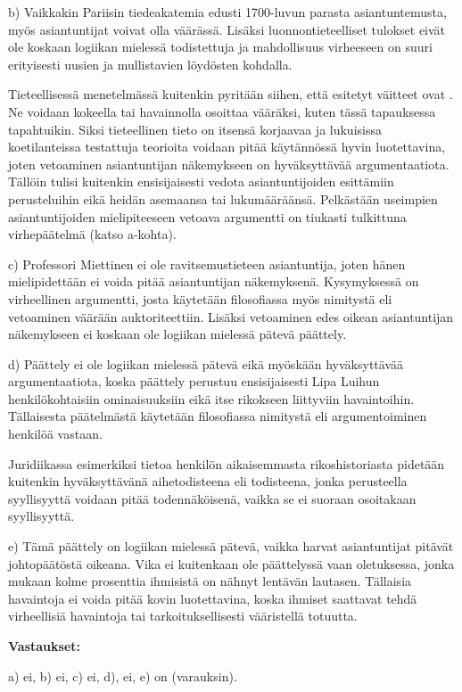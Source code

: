 \begin{esimerkki}
b) Vaikkakin Pariisin tiedeakatemia edusti 1700-luvun parasta asiantuntemusta, myös asiantuntijat voivat olla väärässä. Lisäksi luonnontieteelliset tulokset eivät ole koskaan logiikan mielessä todistettuja ja mahdollisuus virheeseen on suuri erityisesti uusien ja mullistavien löy\-dös\-ten kohdalla.

Tieteellisessä menetelmässä kuitenkin pyritään siihen, että esitetyt väitteet ovat . Ne voidaan kokeella tai havainnolla osoittaa vääräksi, kuten tässä tapauksessa tapahtuikin. Siksi tieteellinen tieto on itsensä korjaavaa ja lukuisissa koetilanteissa testattuja teorioita voidaan pitää käytännössä hyvin luotettavina, joten vetoaminen asiantuntijan näkemykseen on hyväksyttävää argumentaatiota. Tällöin tulisi kuitenkin ensisijaisesti vedota asiantuntijoiden esittämiin perusteluihin eikä heidän asemaansa tai lukumääräänsä. Pelkästään useimpien asiantuntijoiden mielipiteeseen vetoava argumentti on tiukasti tulkittuna virhepäätelmä (katso a-kohta).

c) Professori Miettinen ei ole ravitsemustieteen asiantuntija, joten hänen mielipidettään ei voida pitää asiantuntijan näkemyksenä. Kysymyksessä on virheellinen argumentti, josta käytetään filosofiassa myös nimitystä  eli vetoaminen väärään auktoriteettiin. Lisäksi vetoaminen edes oikean asiantuntijan näkemykseen ei koskaan ole logiikan mielessä pätevä päättely.

d) Päättely ei ole logiikan mielessä pätevä eikä myöskään hy\-väk\-syt\-tä\-vää argumentaatiota, koska päättely perustuu ensisijaisesti Lipa Luihun henkilökohtaisiin ominaisuuksiin eikä itse rikokseen liittyviin havaintoihin. Tällaisesta päätelmästä käytetään filosofiassa nimitystä  eli argumentoiminen henkilöä vastaan.

Juridiikassa esimerkiksi tietoa henkilön aikaisemmasta rikoshistoriasta pidetään kuitenkin hyväksyttävänä aihetodisteena eli todisteena, jonka perusteella syyllisyyttä voidaan pitää todennäköisenä, vaikka se ei suoraan osoitakaan syyllisyyttä.

e) Tämä päättely on logiikan mielessä pätevä, vaikka harvat asiantuntijat pitävät johtopäätöstä oikeana. Vika ei kuitenkaan ole päättelyssä vaan oletuksessa, jonka mukaan kolme prosenttia ihmisistä on nähnyt lentävän lautasen. Tällaisia havaintoja ei voida pitää kovin luotettavina, koska ihmiset saattavat tehdä virheellisiä havaintoja tai tarkoituksellisesti vääristellä totuutta.

{\bf Vastaukset:}

a) ei, b) ei, c) ei, d), ei, e) on (varauksin).
\end{esimerkki}

